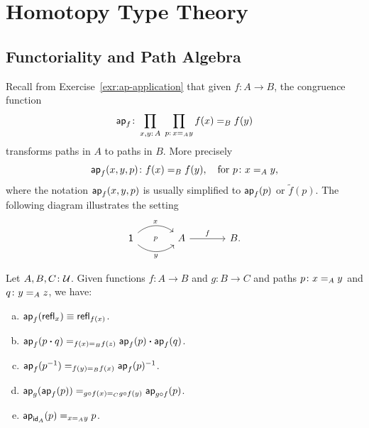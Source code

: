 \chapter{Homotopy Type Theory}

\section{Functoriality and Path Algebra}
    Recall from Exercise~\ref{exr:ap-application} that given $f\colon A\to B$, the congruence function
    \[
        \fun{ap}_f\colon\prod_{x,y\colon A}\;\prod_{p\colon x\eq Ay}f(x)\eq Bf(y)
    \]
    transforms paths in $A$ to paths in $B$. More precisely
    \[
        \fun{ap}_f(x,y,p)\colon f(x)\eq Bf(y),\quad\text{for }p\colon x\eq Ay,
    \]
    where the notation $\mathsf{ap}_f(x,y,p)$ is usually simplified to $\mathsf{ap}_f(p)$ or $\tilde f(p)$. The following diagram illustrates the setting
    \[
        \begin{tikzcd}[column sep=large]
            \fun1
                    \arrow[r,"x",bend left=40]
                    \arrow[r,"y"',bend right=40]
                    \arrow[r,phantom,"\scriptstyle p",description]
                &A
                    \arrow[r,"f"]
                &B.
        \end{tikzcd}
    \]


\begin{prop}\label{prop:ap-properties}
    Let $A,B,C\colon\univ$. Given functions\/ $f\colon A\to B$ and\/ $g\colon B\to C$ and paths\/ $p\colon x\eq Ay$ and\/ $q\colon y\eq Az$, we have:
    \begin{enumerate}[a),font=\upshape]
        \item $\mathsf{ap}_f(\mathsf{refl}_x)\equiv\mathsf{refl}_{f(x)}$.
        \item $\mathsf{ap}_f(p\mathbin{\boldsymbol{\cdot}} q)\mathrel{=_{f(x)\mathrel{=_{B}}f(z)}}\mathsf{ap}_f(p)\mathbin{\boldsymbol{\cdot}}\mathsf{ap}_f(q)$.
        \item $\mathsf{ap}_f(p^{-1})\mathrel{=_{f(y)\mathrel{=_{B}}f(x)}}\mathsf{ap}_f(p)^{-1}$.
        \item $\mathsf{ap}_g(\mathsf{ap}_f(p))\mathrel{=_{g\circ f(x)\mathrel{=_{C}}g\circ f(y)}}\mathsf{ap}_{g\circ f}(p)$.
        \item $\mathsf{ap}_{\mathsf{id}_A}(p)\mathrel{=_{x\mathrel{=_{A}}y}}p$.
    \end{enumerate}
\end{prop}

